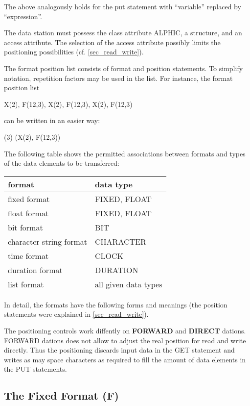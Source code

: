 The above analogously holds for the put statement with ``variable''
replaced by ``expression''.

The data station must possess the class attribute ALPHIC, a structure,
and an access attribute. The selection of the access attribute possibly
limits the positioning possibilities (cf. \ref{sec_read_write}).

The format position list consists of format and position statements.
To simplify notation, repetition factors may be used in the list. For
instance, the format position list

X(2), F(12,3), X(2), F(12,3), X(2), F(12,3)

can be written in an easier way:

(3) (X(2), F(12,3))

The following table shows the permitted associations between formats and
types of the data elements to be transferred:

\begin{tabular}{ll}
format                  & data type \\ \hline
fixed format            & FIXED, FLOAT \\
float format            & FIXED, FLOAT \\
bit format              & BIT          \\
character string format & CHARACTER    \\
time format             & CLOCK        \\
duration format         & DURATION     \\
list format             & all given data types
\end{tabular}

In detail, the formats have the following forms and meanings (the
position statements were explained in \ref{sec_read_write}).

The positioning controls work diffently on {\bf FORWARD} and {\bf DIRECT}
dations. FORWARD dations does not allow to adjust the real position for read
and write directly. 
Thus the positioning discards input data in the GET statement and 
writes as may space characters as required to fill the amount of data elements
in the PUT statements.


\subsection{The Fixed Format (F)}   %
\label{sec_dation_f_format}

